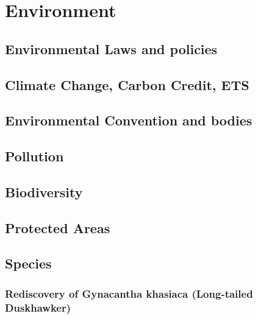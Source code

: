 \chapter{Environment}
\section{Environmental Laws and policies}
\section{Climate Change, Carbon Credit, ETS}
\section{Environmental Convention and bodies}
\section{Pollution}
\section{Biodiversity}
\section{Protected Areas}
\section{Species}
\subsection{Rediscovery of Gynacantha khasiaca (Long-tailed Duskhawker)}


